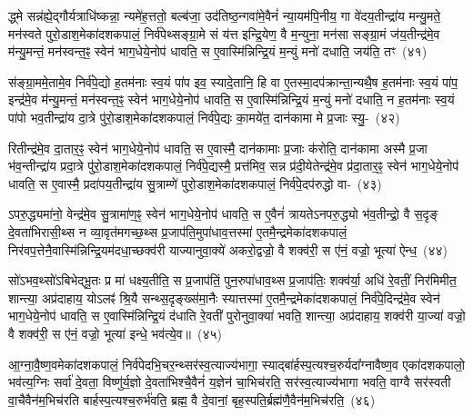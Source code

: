 द्ध्मे सन्न॑ह्ये॒द्गौर्यत्राधि॑ष्कन्ना॒ न्यमे॑ह॒त्ततो॒ बल्ब॑जा॒ उद॑तिष्ठ॒न्गवा॑\-मे॒वैनं॑ न्या॒यम॑पि॒नीय॒ गा वे॑दय॒तीन्द्रा॑य मन्यु॒मते॒ मन॑स्वते पुरो॒डाश॒मेका॑\-दश\-कपालं॒ निर्व॑पेथ्सङ्ग्रा॒मे सं य॑त्त इन्द्रि॒येण॒ वै म॒न्युना॒ मन॑सा सङ्ग्रा॒मं ज॑य॒तीन्द्र॑मे॒व म॑न्यु॒मन्तं॒ मन॑स्वन्त॒ꣴ॒ स्वेन॑ भाग॒\-धेये॒नोप॑ धावति॒ स ए॒वास्मि॑न्निन्द्रि॒यं म॒न्युं मनो॑ दधाति॒ जय॑ति॒ तꣳ~(४१)\ip

स॑ङ्ग्रा॒ममे॒तामे॒व निर्व॑पे॒द्यो ह॒तम॑नाः स्व॒यं पा॑प इव॒ स्यादे॒तानि॒ हि वा ए॒तस्मा॒दप॑क्रान्ता॒न्यथै॒ष ह॒तम॑नाः स्व॒यं पा॑प॒ इन्द्र॑मे॒व म॑न्यु॒मन्तं॒ मन॑स्वन्त॒ꣴ॒ स्वेन॑ भाग॒\-धेये॒नोप॑ धावति॒ स ए॒वास्मि॑न्निन्द्रि॒यं म॒न्युं मनो॑ दधाति॒ न ह॒तम॑नाः स्व॒यं पा॑पो भव॒तीन्द्रा॑य दा॒त्रे पु॑रो॒डाश॒मेका॑\-दश\-कपालं॒ निर्व॑पे॒द्यः का॒मये॑त॒ दान॑कामा मे प्र॒जाः स्यु॒-~(४२)\ip

रितीन्द्र॑मे॒व दा॒तार॒ꣴ॒ स्वेन॑ भाग॒\-धेये॒नोप॑ धावति॒ स ए॒वास्मै॒ दान॑कामाः प्र॒जाः क॑रोति॒ दान॑कामा अस्मै प्र॒जा भ॑व॒न्तीन्द्रा॑य प्रदा॒त्रे पु॑रो॒डाश॒मेका॑\-दश\-कपालं॒ निर्व॑पे॒द्यस्मै॒ प्रत्त॑मिव॒ सन्न प्र॑दी॒येतेन्द्र॑मे॒व प्र॑दा॒तार॒ꣴ॒ स्वेन॑ भाग॒\-धेये॒नोप॑ धावति॒ स ए॒वास्मै॒ प्रदा॑पय॒तीन्द्रा॑य सु॒त्राम्णे॑ पुरो॒डाश॒मेका॑\-दश\-कपालं॒ निर्व॑पे॒दप॑रुद्धो वा-~(४३)\ip

ऽपरु॒द्ध्यमा॑नो॒ वेन्द्र॑मे॒व सु॒त्रामा॑ण॒ꣴ॒ स्वेन॑ भाग॒\-धेये॒नोप॑ धावति॒ स ए॒वैनं॑ त्रायते\-ऽनपरु॒द्ध्यो भ॑व॒तीन्द्रो॒ वै स॒दृङ् दे॒वता॑भिरासी॒थ्स न व्या॒वृत॑मगच्छ॒थ्स प्र॒जा\-प॑ति॒मुपा॑\-धाव॒त्तस्मा॑ ए॒तमै॒न्द्रमेका॑\-दश\-कपालं॒ निर॑वप॒त्तेनै॒वास्मि॑न्निन्द्रि॒य\-म॑दधा॒च्छक्व॑री याज्यानुवा॒क्ये॑ अकरो॒द्वज्रो॒ वै शक्व॑री॒ स ए॑नं॒ वज्रो॒ भूत्या॑ ऐन्ध॒~(४४)\ip

सो॑\-ऽभव॒थ्सो॑\-ऽबिभेद्भू॒तः प्र मा॑ धक्ष्य॒तीति॒ स प्र॒जा\-प॑तिं॒ पुन॒रुपा॑धाव॒थ्स प्र॒जा\-प॑तिः॒ शक्व॑र्या॒ अधि॑ रे॒वतीं॒ निर॑मिमीत॒ शान्त्या॒ अप्र॑दाहाय॒ यो\-ऽलꣴ॑ श्रि॒यै सन्थ्स॒दृङ्ख्स॑मा॒नैः स्यात्तस्मा॑ ए॒तमै॒न्द्रमेका॑\-दश\-कपालं॒ निर्व॑पे॒दिन्द्र॑मे॒व स्वेन॑ भाग॒\-धेये॒नोप॑ धावति॒ स ए॒वास्मि॑न्निन्द्रि॒यं द॑धाति रे॒वती॑ पुरोनुवा॒क्या॑ भवति॒ शान्त्या॒ अप्र॑दाहाय॒ शक्व॑री या॒ज्या॑ वज्रो॒ वै शक्व॑री॒ स ए॑नं॒ वज्रो॒ भूत्या॑ इन्धे॒ भव॑त्ये॒व॥~(४५)\ip

{\anuvakamend[{अपि॒ तꣴ स्यु॑र्वैन्ध भवति॒ चतु॑र्दश च}]}

आ॒ग्ना॒वै॒ष्ण॒वमेका॑दशकपालं॒ निर्व॑पेदभि॒चर॒न्थ्सर॑स्व॒त्याज्य॑\-भागा॒ स्याद्बा॑र्\mbox{}हस्प॒त्य\-श्च॒रुर्यदा᳚ग्नावैष्ण॒व एका॑\-दश\-कपालो॒ भव॑त्य॒ग्निः सर्वा॑ दे॒वता॒ विष्णु॑र्य॒ज्ञो दे॒वता॑भिश्चै॒वैनं॑ य॒ज्ञेन॑ चा॒भिच॑रति॒ सर॑स्व॒त्याज्य॑भागा भवति॒ वाग्वै सर॑स्वती वा॒चैवैन॑म॒भिच॑रति बार्\mbox{}हस्प॒त्यश्च॒रुर्भ॑वति॒ ब्रह्म॒ वै दे॒वानां॒ बृह॒स्पति॒र्ब्रह्म॑णै॒वैन॑म॒भिच॑रति॒~(४६)\ip

